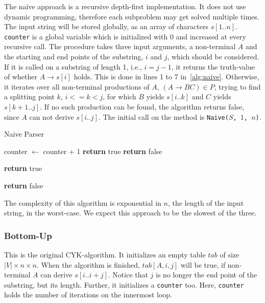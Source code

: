 The na\"{i}ve approach is a recursive depth-first implementation.
It does not use dynamic programming, therefore each subproblem may get solved multiple times.
The input string will be stored globally, as an array of characters $s[1..n]$.
\texttt{counter} is a global variable which is initialized with $0$ and increased at every recursive call.
The procedure takes three input arguments, a non-terminal $A$ and the starting and end points of the substring, $i$ and $j$, which should be considered.
If it is called on a substring of length 1, i.e., $i = j-1$, it returns the truth-value of whether $A\rightarrow s[i]$ holds.
This is done in lines 1 to 7 in~\ref{alg:naive}.
Otherwise, it iterates over all non-terminal productions of $A$, $(A\rightarrow BC) \in P$, trying to find a splitting point $k$, $i <= k < j$, for which $B$ yields $s[i..k]$ and $C$ yields $s[k+1..j]$.
If no such production can be found, the algorithm returns false, since $A$ can not derive $s[i..j]$.
The initial call on the method is \texttt{Naive($S$, $1$, $n$)}.

\begin{algorithm}[H]
    \caption{Naive Parser}
    \label{alg:naive}
    \begin{algorithmic}[1]
        \State counter $\leftarrow$ counter + 1
                \State \textbf{return} true
            \Else
                \State \textbf{return} false
            \EndIf
        \EndIf

                    \State \textbf{return} true
                \EndIf
            \EndFor
        \EndFor

        \State \textbf{return} false
        \EndFunction
    \end{algorithmic}
\end{algorithm}

The complexity of this algorithm is exponential in $n$, the length of the input string, in the worst-case.
We expect this approach to be the slowest of the three.


\subsubsection{Bottom-Up}
\label{sec:bottom_up}
This is the original CYK-algorithm.
It initializes an empty table $tab$ of size $|V|\times n\times n$.
When the algorithm is finished, $tab[A,i,j]$ will be true, if non-terminal $A$ can derive $s[i..i+j]$.
Notice that $j$ is no longer the end point of the substring, but its length.
Further, it initializes a \texttt{counter} too.
Here, \texttt{counter} holds the number of iterations on the innermost loop.

